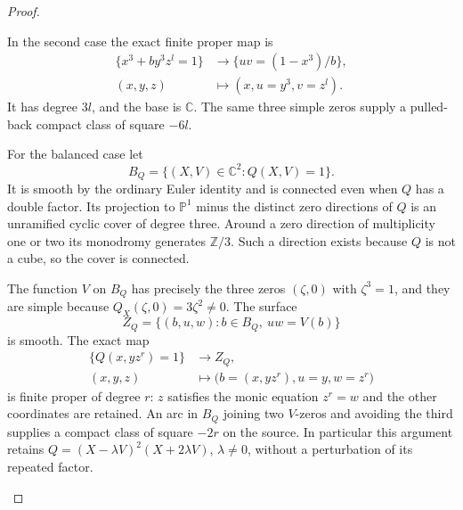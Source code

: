 \begin{proof}
\begin{enumerate}[label={$\langle1\rangle$\arabic*.},leftmargin=*]
In the second case the exact finite proper map is
\[
 \begin{split}
 \{x^3+b y^3z^l=1\}&\longrightarrow
                 \{uv=(1-x^3)/b\},\\
 (x,y,z)&\longmapsto(x,u=y^3,v=z^l).
 \end{split}
\]
It has degree $3l$, and the base is $\mathbb C$.
The same three simple zeros supply a pulled-back
compact class of square $-6l$.

For the balanced case let
\[
                 B_Q=\{(X,V)\in\mathbb C^2:Q(X,V)=1\}.
\]
It is smooth by the ordinary Euler identity and is
connected even when $Q$ has a double factor. Its
projection to $\mathbb P^1$ minus the distinct zero
directions of $Q$ is an unramified cyclic cover of
degree three. Around a zero direction of multiplicity
one or two its monodromy generates $\mathbb Z/3$.
Such a direction exists because $Q$ is not a cube,
so the cover is connected.

The function $V$ on $B_Q$ has precisely the three
zeros $(\zeta,0)$ with $\zeta^3=1$, and they are
simple because $Q_X(\zeta,0)=3\zeta^2\ne0$.
The surface
\[
             Z_Q=\{(b,u,w):b\in B_Q,\ uw=V(b)\}
\]
is smooth. The exact map
\[
 \begin{split}
       \{Q(x,yz^r)=1\}&\longrightarrow Z_Q,\\
       (x,y,z)&\longmapsto
                    \bigl(b=(x,yz^r),u=y,w=z^r\bigr)
 \end{split}                                                   \tag{R19.5}
\]
is finite proper of degree $r$: $z$ satisfies the
monic equation $z^r=w$ and the other coordinates are
retained. An arc in $B_Q$ joining two $V$-zeros and
avoiding the third supplies a compact class of square
$-2r$ on the source. In particular this argument
retains $Q=(X-\lambda V)^2(X+2\lambda V)$,
$\lambda\ne0$, without a perturbation of its
repeated factor.


\end{enumerate}
\end{proof}
